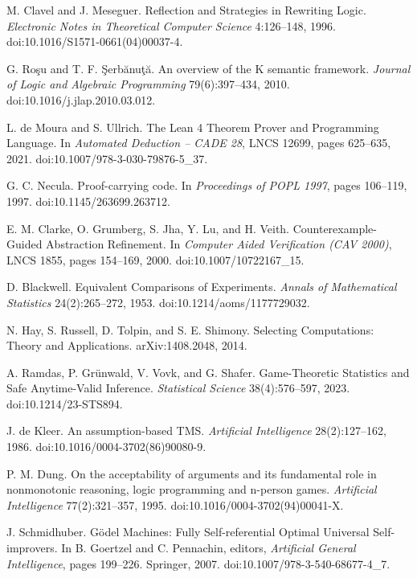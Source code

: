 M. Clavel and J. Meseguer. Reflection and Strategies in Rewriting Logic. \emph{Electronic Notes in Theoretical Computer Science} 4:126--148, 1996. doi:10.1016/S1571-0661(04)00037-4.

G. Ro\c{s}u and T. F. \c{S}erb\u{a}nu\c{t}\u{a}. An overview of the K semantic framework. \emph{Journal of Logic and Algebraic Programming} 79(6):397--434, 2010. doi:10.1016/j.jlap.2010.03.012.

L. de Moura and S. Ullrich. The Lean 4 Theorem Prover and Programming Language. In \emph{Automated Deduction -- CADE 28}, LNCS 12699, pages 625--635, 2021. doi:10.1007/978-3-030-79876-5\_37.

G. C. Necula. Proof-carrying code. In \emph{Proceedings of POPL 1997}, pages 106--119, 1997. doi:10.1145/263699.263712.

E. M. Clarke, O. Grumberg, S. Jha, Y. Lu, and H. Veith. Counterexample-Guided Abstraction Refinement. In \emph{Computer Aided Verification (CAV 2000)}, LNCS 1855, pages 154--169, 2000. doi:10.1007/10722167\_15.

D. Blackwell. Equivalent Comparisons of Experiments. \emph{Annals of Mathematical Statistics} 24(2):265--272, 1953. doi:10.1214/aoms/1177729032.

N. Hay, S. Russell, D. Tolpin, and S. E. Shimony. Selecting Computations: Theory and Applications. arXiv:1408.2048, 2014.

A. Ramdas, P. Gr\"unwald, V. Vovk, and G. Shafer. Game-Theoretic Statistics and Safe Anytime-Valid Inference. \emph{Statistical Science} 38(4):576--597, 2023. doi:10.1214/23-STS894.

J. de Kleer. An assumption-based TMS. \emph{Artificial Intelligence} 28(2):127--162, 1986. doi:10.1016/0004-3702(86)90080-9.

P. M. Dung. On the acceptability of arguments and its fundamental role in nonmonotonic reasoning, logic programming and n-person games. \emph{Artificial Intelligence} 77(2):321--357, 1995. doi:10.1016/0004-3702(94)00041-X.

J. Schmidhuber. G\"odel Machines: Fully Self-referential Optimal Universal Self-improvers. In B. Goertzel and C. Pennachin, editors, \emph{Artificial General Intelligence}, pages 199--226. Springer, 2007. doi:10.1007/978-3-540-68677-4\_7.


